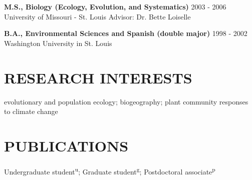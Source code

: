 \documentclass[11pt,english]{article}\usepackage[]{graphicx}\usepackage[]{color}
\begin{document}
\begin{flushleft}
{\bf M.S., Biology (Ecology, Evolution, and Systematics)} \hfill {2003 - 2006} \newline
University of Missouri - St. Louis \newline
Advisor: Dr. Bette Loiselle
\vspace{0.5ex}

{\bf B.A., Environmental Sciences and Spanish (double major)} \hfill {1998 - 2002} \newline
Washington University in St. Louis
\end{flushleft}



\section*{RESEARCH INTERESTS}
\vspace{-0.5ex}

evolutionary and population ecology; biogeography; plant community responses to climate change


\vspace{1ex}
\section*{PUBLICATIONS}
\vspace{-0.5ex}

Undergraduate student\textsuperscript{u}; Graduate student\textsuperscript{g}; Postdoctoral associate\textsuperscript{p} 
\end{document}
